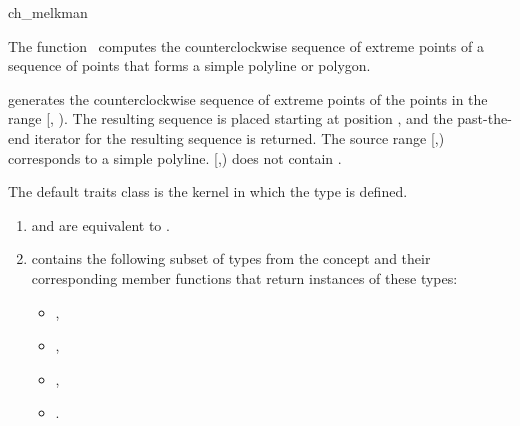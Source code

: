 

\begin{ccRefFunction}{ch_melkman}  %

\ccDefinition
  
The function \ccRefName\ computes the counterclockwise sequence of
extreme points of a sequence of points that forms a simple polyline or polygon.


            {generates the counterclockwise sequence of extreme points
            of the points in the range [, ). 
            The resulting sequence is placed starting at
            position , and the past-the-end iterator for
            the resulting sequence is returned.
            \ccPrecond %
            The source range [,) corresponds 
            to a simple polyline. 
            [,) does not contain }.

The default traits class  is the kernel in which the
type  is defined.


\begin{enumerate}
   \item    {} and 
            are equivalent to .
   \item    {} contains the following subset of types from
            the concept  and their corresponding member
            functions that return instances of these types:
            \begin{itemize}
                \item {},
		\item {},
                \item {}, 
                \item {}.
            \end{itemize}
\end{enumerate}


\end{ccRefFunction}
